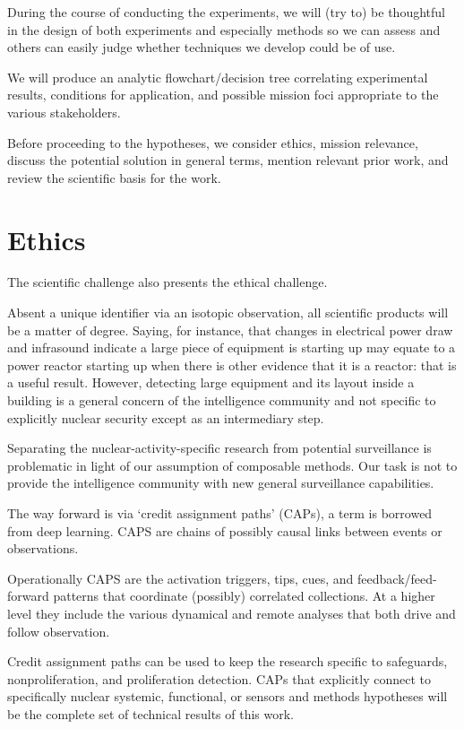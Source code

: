 \documentclass{article} %
\begin{document}
During the course of conducting the experiments, we will (try to) be thoughtful in the design of both experiments and especially methods so we can assess and others can easily judge whether techniques we develop could be of use.

We will produce an analytic flowchart/decision tree correlating experimental results, conditions for application, and possible mission foci appropriate to the various stakeholders.


\vspace{20 pt}
\begin{center}
\end{center}
\vspace{20 pt}

Before proceeding to the hypotheses, we consider ethics, mission relevance, discuss the potential solution in general terms, mention relevant prior work, and review the scientific basis for the work.

\pagebreak
\section {Ethics }
The scientific challenge also presents the ethical challenge. 

Absent a unique identifier via an isotopic observation, all scientific products will be a matter of degree. Saying, for instance, that changes in electrical power draw and infrasound indicate a large piece of equipment is starting up may equate to a power reactor starting up when there is other evidence that it is a reactor: that is a useful result. However, detecting large equipment and its layout inside a building is a general concern of the intelligence community and not specific to explicitly nuclear security except as an intermediary step.

Separating the nuclear-activity-specific research from potential surveillance is problematic in light of our assumption of composable methods. Our task is not to provide the intelligence community with new general surveillance capabilities. 

The way forward is via `credit assignment paths' (CAPs), a term is borrowed from deep learning. CAPS are chains of possibly causal links between events or observations. 

Operationally CAPS are the activation triggers, tips, cues, and feedback/feed-forward patterns that coordinate (possibly) correlated collections. At a higher level they include the various dynamical and remote analyses that both drive and follow observation.

Credit assignment paths can be used to keep the research specific to safeguards, nonproliferation, and proliferation detection. CAPs that explicitly connect to specifically nuclear systemic, functional, or sensors and methods hypotheses will be the complete set of technical results of this work.
\end{document}
